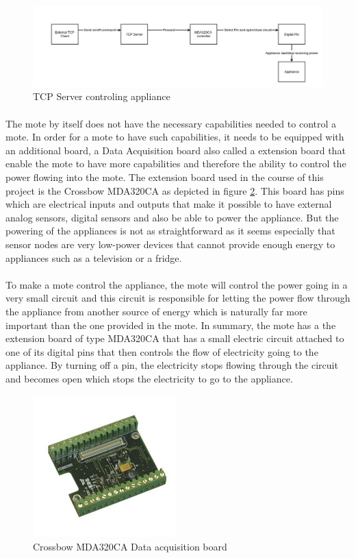 \documentclass[oneside,12pt,a4paper,final]{book}
\begin{document}
\begin{figure}[htbp]
\centering
\includegraphics[scale=0.35]{img/appliance_control.jpg}
\caption{TCP Server controling appliance}
\label{fig:appliance_control}
\end{figure}

\paragraph{}
The mote by itself does not have the necessary capabilities needed to control a mote. In order for a mote to have such capabilities, it needs to be equipped with an additional board, a Data Acquisition board also called a extension board that enable the mote to have more capabilities and therefore the ability to control the power flowing into the mote. The extension board used in the course of this project is the Crossbow MDA320CA as depicted in figure \ref{fig:mda320ca}. This board has pins which are electrical inputs and outputs that make it possible to have external analog sensors, digital sensors and also be able to power the appliance. But the powering of the appliances is not as straightforward as it seems especially that sensor nodes are very low-power devices that cannot provide enough energy to appliances such as a television or a fridge.
\paragraph{}
To make a mote control the appliance, the mote will control the power going in a very small circuit and this circuit is responsible for letting the power flow through the appliance from another source of energy which is naturally far more important than the one provided in the mote. In summary, the mote has a the extension board of type MDA320CA that has a small electric circuit attached to one of its digital pins that then controls the flow of electricity going to the appliance. By turning off a pin, the electricity stops flowing through the circuit and becomes open which stops the electricity to go to the appliance. 

\begin{figure}[htbp]
\centering
\includegraphics[scale=0.8]{img/mda320.jpg}
\caption{Crossbow MDA320CA Data acquisition board}
\label{fig:mda320ca}
\end{figure}
\end{document}
